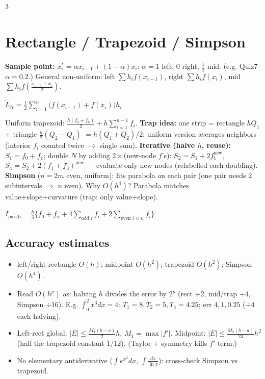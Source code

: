 \documentclass[9pt]{extarticle}
\newcommand{\wk}[1]{\textbf{\textcolor{OliveGreen}{#1}}}
\begin{document}
\begin{multicols}{3}
\section{Rectangle / Trapezoid / Simpson}
\begin{sloppypar}\raggedright
\textbf{Sample point:} $x_i^*=\alpha x_{i-1}+(1-\alpha)x_i$: $\alpha=1$ left, $0$ right, $\tfrac12$ mid. (e.g. Quiz7 $\alpha=0.2$.)
General non-uniform: left $\sum h_if(x_{i-1})$, right $\sum h_if(x_i)$, mid $\sum h_if(\tfrac{x_{i-1}+x_i}2)$.
\begin{kbox}
\centering
$\tilde I_{\text{Tr}}=\tfrac12\sum_{i=1}^n\big(f(x_{i-1})+f(x_i)\big)h_i$
\end{kbox}
Uniform trapezoid: $\tfrac{h(f_0+f_n)}2+h\sum_{i=1}^{n-1}f_i$.
\wk{Trap idea:} one strip = rectangle $hQ_1$ + triangle $\tfrac h2(Q_2-Q_1)$ $=h(Q_1+Q_2)/2$; uniform version averages neighbors (interior $f_i$ counted twice $\to$ single sum).
\wk{Iterative (halve $h$, reuse):} $S_1=f_0+f_1$; double $N$ by adding $2\times$(new-node $f$'s): $S_2=S_1+2f_1^{\text{new}}$, $S_4=S_2+2(f_1+f_3)^{\text{new}}$ — evaluate only new nodes (relabelled each doubling).
\textbf{Simpson} ($n=2m$ even, uniform): fits parabola on each pair (one pair needs 2 subintervals $\Rightarrow$ $n$ even). Why $O(h^4)$? Parabola matches value+slope+curvature (trap: only value+slope).
\begin{kbox}
\centering
$I_{\text{parab}}=\tfrac{h}{3}\big\{f_0+f_n+4\sum_{\text{odd }i}f_i+2\sum_{\text{even }i<n}f_i\big\}$
\end{kbox}

\subsection{Accuracy estimates}
\begin{itemize}
\item left/right rectangle $O(h)$; midpoint $O(h^2)$; trapezoid $O(h^2)$; Simpson $O(h^4)$.
\item Read $O(h^p)$ as: halving $h$ divides the error by $2^p$ (rect $\div2$, mid/trap $\div4$, Simpson $\div16$). E.g. $\int_0^2x^3dx=4$: $T_1=8,T_2=5,T_4=4.25$; err $4,1,0.25$ ($\div4$ each halving).
\item Left-rect global: $|E|\le\tfrac{M_1(b-a)}2h$, $M_1=\max|f'|$. Midpoint: $|E|\le\tfrac{M_2(b-a)}{24}h^2$ (half the trapezoid constant $1/12$). (Taylor + symmetry kills $f'$ term.)
\item No elementary antiderivative ($\int e^{x^2}dx$, $\int\tfrac{dx}{\ln x}$): cross-check Simpson vs trapezoid.
\end{itemize}
\end{sloppypar}


\end{multicols}
\end{document}
